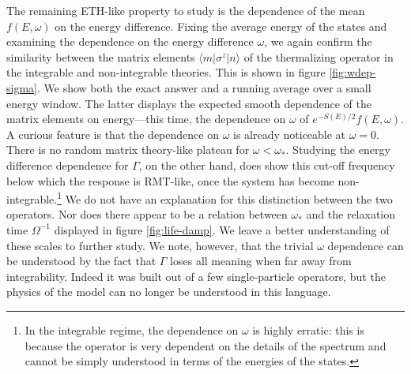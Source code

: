 The remaining ETH-like property to study is the dependence of the mean $f(E,\omega)$ on the energy difference. Fixing the average energy of the states and examining the dependence on the energy difference $\omega$, we again confirm the similarity between the matrix elements  $\langle m|\sigma^z|n\rangle$ of the thermalizing operator in the integrable and non-integrable theories. This is shown in figure  \ref{fig:wdep-sigma}. We show both the exact answer and a running average over a small energy window. The latter displays the expected smooth dependence of the matrix elements on energy---this time, the dependence on $\omega$ of $e^{-S(E)/2} f(E,\omega)$. A curious feature is that the dependence on $\omega$ is already noticeable at $\omega=0$. There is no random matrix theory-like plateau for $\omega<\omega_{*}$. Studying the energy difference dependence for $\Gamma$, on the other hand, does show this cut-off frequency below which the response is RMT-like, once the system has become non-integrable.\footnote{In the integrable regime, the dependence on $\omega$ is highly erratic: this is because the operator is very dependent on the details of the spectrum and cannot be simply understood in terms of the energies of the states.} We do not have an explanation for this distinction between the two operators. Nor does there appear to be a relation between $\omega_{*}$ and the relaxation time $\Omega^{-1}$ displayed in figure \ref{fig:life-damp}. We leave a better understanding of these scales to further study. We note, however, that the trivial $\omega$ dependence can be understood by the fact that $\Gamma$ loses all meaning when far away from integrability. Indeed it was built out of a few single-particle operators, but the physics of the model can no longer be understood in this language.

